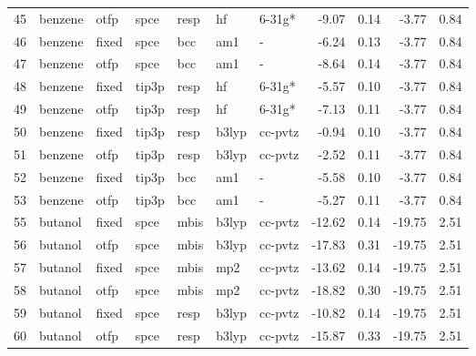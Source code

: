 \begin{tabular}{lllllllrrrr}
45  &                       benzene &   otfp &   spce &   resp &      hf &       6-31g* &       -9.07 &     0.14 &       -3.77 &      0.84 \\
46  &                       benzene &  fixed &   spce &    bcc &     am1 &            - &       -6.24 &     0.13 &       -3.77 &      0.84 \\
47  &                       benzene &   otfp &   spce &    bcc &     am1 &            - &       -8.64 &     0.14 &       -3.77 &      0.84 \\
48  &                       benzene &  fixed &  tip3p &   resp &      hf &       6-31g* &       -5.57 &     0.10 &       -3.77 &      0.84 \\
49  &                       benzene &   otfp &  tip3p &   resp &      hf &       6-31g* &       -7.13 &     0.11 &       -3.77 &      0.84 \\
50  &                       benzene &  fixed &  tip3p &   resp &   b3lyp &      cc-pvtz &       -0.94 &     0.10 &       -3.77 &      0.84 \\
51  &                       benzene &   otfp &  tip3p &   resp &   b3lyp &      cc-pvtz &       -2.52 &     0.11 &       -3.77 &      0.84 \\
52  &                       benzene &  fixed &  tip3p &    bcc &     am1 &            - &       -5.58 &     0.10 &       -3.77 &      0.84 \\
53  &                       benzene &   otfp &  tip3p &    bcc &     am1 &            - &       -5.27 &     0.11 &       -3.77 &      0.84 \\
55  &                       butanol &  fixed &   spce &   mbis &   b3lyp &      cc-pvtz &      -12.62 &     0.14 &      -19.75 &      2.51 \\
56  &                       butanol &   otfp &   spce &   mbis &   b3lyp &      cc-pvtz &      -17.83 &     0.31 &      -19.75 &      2.51 \\
57  &                       butanol &  fixed &   spce &   mbis &     mp2 &      cc-pvtz &      -13.62 &     0.14 &      -19.75 &      2.51 \\
58  &                       butanol &   otfp &   spce &   mbis &     mp2 &      cc-pvtz &      -18.82 &     0.30 &      -19.75 &      2.51 \\
59  &                       butanol &  fixed &   spce &   resp &   b3lyp &      cc-pvtz &      -10.82 &     0.14 &      -19.75 &      2.51 \\
60  &                       butanol &   otfp &   spce &   resp &   b3lyp &      cc-pvtz &      -15.87 &     0.33 &      -19.75 &      2.51 \\

\end{tabular}
